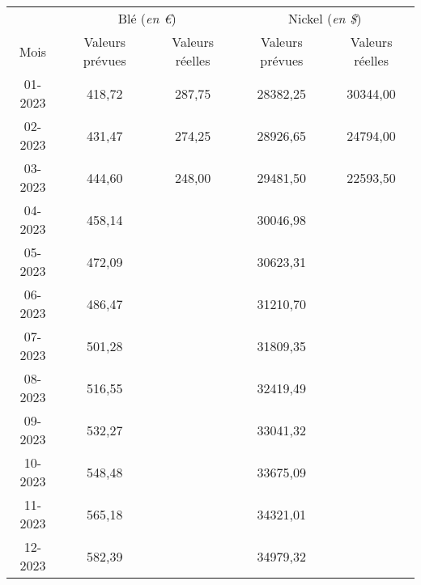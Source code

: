 \begin{tabular}{ccccc}
\toprule
& \multicolumn{2}{c}{Blé (\textit{en \euro})} & \multicolumn{2}{c}{Nickel  (\textit{en \$})} \\
Mois & Valeurs prévues & Valeurs réelles & Valeurs prévues & Valeurs réelles \\
\cmidrule(r){1-1}\cmidrule(lr){2-3}\cmidrule(lr){4-5}
01-2023 & 418,72 & 287,75 & 28382,25 & 30344,00 \\
02-2023 & 431,47 & 274,25 & 28926,65 & 24794,00 \\
03-2023 & 444,60 & 248,00 & 29481,50 & 22593,50 \\
04-2023 & 458,14 &        & 30046,98 &  \\
05-2023 & 472,09 &        & 30623,31 &  \\
06-2023 & 486,47 &        & 31210,70 &  \\
07-2023 & 501,28 &        & 31809,35 &  \\
08-2023 & 516,55 &        & 32419,49 &  \\
09-2023 & 532,27 &        & 33041,32 &  \\
10-2023 & 548,48 &        & 33675,09 &  \\
11-2023 & 565,18 &        & 34321,01 &  \\
12-2023 & 582,39 &        & 34979,32 &  \\
\bottomrule
\end{tabular}%
